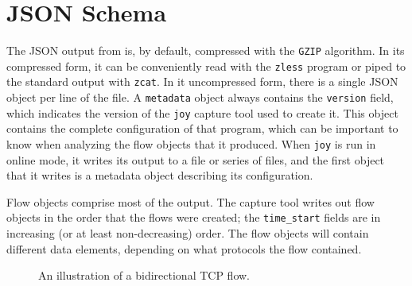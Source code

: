 \documentclass{book}
\begin{document}
\chapter{JSON Schema}
\label{chapterschema}
The JSON output from  is, by default, compressed with the
\texttt{GZIP} algorithm.  In its compressed form, it can be
conveniently read with the \texttt{zless} program or piped to the
standard output with \texttt{zcat}.  In it uncompressed form, there is
a single JSON object per line of the file.  A \texttt{metadata} object
always contains the \texttt{version} field, which indicates the
version of the \texttt{joy} capture tool used to create it.  This
object contains the complete configuration of that program, which can
be important to know when analyzing the flow objects that it produced.
When \texttt{joy} is run in online mode, it writes its output to a
file or series of files, and the first object that it writes is a
metadata object describing its configuration.

Flow objects comprise most of the output.  The capture tool writes out
flow objects in the order that the flows were created; the \texttt{time\_start}
fields are in increasing (or at least non-decreasing)
order.  The flow objects will contain different data elements,
depending on what protocols the flow contained.


\begin{figure}
\caption{An illustration of a bidirectional TCP flow.}
\label{tcpexample}
\begin{center}
\end{center}
\end{figure}
\end{document}
